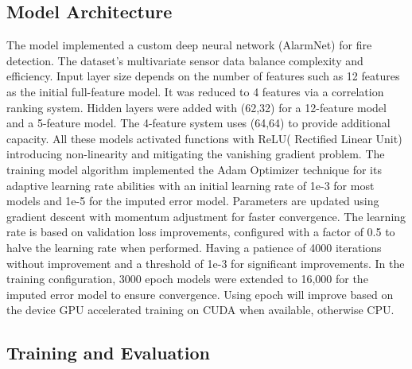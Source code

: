 \documentclass[conference]{IEEEtran}
\begin{document}
\subsection{\-Model Architecture}
The model implemented a custom deep neural network (AlarmNet) for fire detection. The dataset's multivariate sensor data balance complexity and efficiency. Input layer size depends on the number of features such as 12 features as the initial full-feature model. It was reduced to 4 features via a correlation ranking system. Hidden layers were added with (62,32) for a 12-feature model and a 5-feature model. The 4-feature system uses (64,64) to provide additional capacity. All these models activated functions with ReLU( Rectified Linear Unit) introducing non-linearity and mitigating the vanishing gradient problem. 
The training model algorithm implemented the Adam Optimizer technique for its adaptive learning rate abilities with an initial learning rate of 1e-3 for most models and 1e-5 for the imputed error model. Parameters are updated using gradient descent with momentum adjustment for faster convergence. The learning rate is based on validation loss improvements, configured with a factor of 0.5 to halve the learning rate when performed. Having a patience of 4000 iterations without improvement and a threshold of 1e-3 for significant improvements. In the training configuration, 3000 epoch models were extended to 16,000 for the imputed error model to ensure convergence. Using epoch will improve based on the device GPU accelerated training on CUDA when available, otherwise CPU. 




\subsection{Training and Evaluation}\label{SCM}
\end{document}
